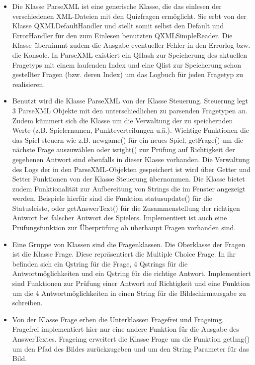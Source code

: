 \documentclass[10pt,a4paper,titlepage]{article}
\begin{document}
\begin{itemize}
	\item Die Klasse ParseXML ist eine generische Klasse, die das einlesen der verschiedenen XML-Dateien mit den Quizfragen ermöglicht.
	Sie erbt von der Klasse QXMLDefaultHandler und stellt somit selbst den Default und ErrorHandler für den zum Einlesen benutzten QXMLSimpleReader.
	Die Klasse übernimmt zudem die Ausgabe eventueller Fehler in den Errorlog bzw. die Konsole.
	In ParseXML existiert ein QHash zur Speicherung des aktuellen Fragetyps mit einem laufenden Index und eine Qlist zur Speicherung schon gestellter Fragen (bzw. deren Index) um das Logbuch für jeden Fragetyp zu realisieren.
	\item Benutzt wird die Klasse ParseXML von der Klasse Steuerung.
	Steuerung legt 3 ParseXML Objekte mit den unterschiedlichen zu parsenden Fragetypen an.
	Zudem kümmert sich die Klasse um die Verwaltung der zu speichernden Werte (z.B. Spielernamen, Punkteverteilungen u.ä.).
	Wichtige Funktionen die das Spiel steuern wie z.B. newgame() für ein neues Spiel, getFrage() um die nächste Frage auszuwählen oder isright() zur Prüfung auf Richtigkeit der gegebenen Antwort sind ebenfalls in dieser Klasse vorhanden.
	Die Verwaltung des Logs der in den ParseXML-Objekten gespeichert ist wird über Getter und Setter Funktionen von der Klasse Steuerung übernommen.
	Die Klasse bietet zudem Funktionalität zur Aufbereitung von Strings die im Fenster angezeigt werden.
	Beispiele hierfür sind die Funktion statusupdate() für die Statusleiste, oder getAnswerText() für die Zusammenstellung der richtigen Antwort bei falscher Antwort des Spielers.
	Implementiert ist auch eine Prüfungsfunktion zur Überprüfung ob überhaupt Fragen vorhanden sind.
	\item Eine Gruppe von Klassen sind die Fragenklassen.
	Die Oberklasse der Fragen ist die Klasse Frage.
	Diese repräsentiert die Multiple Choice Frage.
	In ihr befinden sich ein Qstring für die Frage, 4 Qstrings für die Antwortmöglichkeiten und ein Qstring für die richtige Antwort.
	Implementiert sind Funktionen zur Prüfung einer Antwort auf Richtigkeit und eine Funktion um die 4 Antwortmöglichkeiten in einen String für die Bildschirmausgabe zu schreiben.
	\item Von der Klasse Frage  erben die Unterklassen Fragefrei und Frageimg.
	Fragefrei implementiert hier nur eine andere Funktion für die Ausgabe des AnswerTextes.
	Frageimg erweitert die Klasse Frage um die Funktion getImg() um den Pfad des Bildes zurückzugeben und um den String Parameter für das Bild.

\end{itemize}
\end{document}
